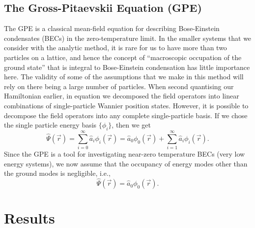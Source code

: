 \documentclass[a4paper,10pt]{article}
\begin{document}
\subsection{The Gross-Pitaevskii Equation (GPE)}
The GPE is a classical mean-field equation for describing Bose-Einstein condensates (BECs) in the zero-temperature limit. In the smaller systems that we consider with the analytic method, it is rare
for us to have more than two particles on a lattice, and hence the concept of ``macroscopic occupation of the ground state'' that is integral to Bose-Einstein condensation has little importance here.
The validity of some of the assumptions that we make in this method will rely on there being a large number of particles. 
When second quantising our Hamiltonian earlier, in equation \label{field_operators_wannier} we decomposed the field operators into linear combinations of single-particle Wannier position states. 
However, it is possible to decompose the field operators into any complete single-particle basis. If we chose the single particle energy basis $\{\phi_i\}$, then we get
\begin{equation}
 \hat{\Psi}(\vec{r})=\sum_{i=0}^\infty \hat{a}_i\phi_{i}(\vec{r}) = \hat{a}_0\phi_{0}(\vec{r}) + \sum_{i=1}^\infty \hat{a}_i\phi_{i}(\vec{r}).
\end{equation}
Since the GPE is a tool for investigating near-zero temperature BECs (very low energy systems), we now assume that the occupancy of energy modes other than the ground modes is negligible, i.e.,
\begin{equation}
 \hat{\Psi}(\vec{r})=\hat{a}_0\phi_{0}(\vec{r}).
\end{equation}


\newpage
\section{Results}
\end{document}

